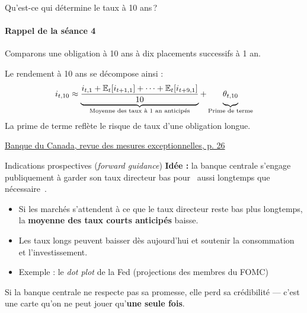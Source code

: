 \documentclass[aspectratio=169]{beamer}
\begin{document}
\begin{frame}[t]{Qu’est-ce qui détermine le taux à 10 ans\,?}\examtag
   \framesubtitle{Rappel de la séance 4}
   \vspace{0.25cm}
   Comparons une obligation à 10 ans à dix placements successifs à 1 an.

   \vspace{0.18cm}
   \begin{defbox}
      \small\raggedright
      Le rendement à 10 ans se décompose ainsi :
      {\large
      \begin{equation*}
         i_{t,10} \approx \underbrace{\frac{i_{t,1} + \mathbb{E}_t[i_{t+1,1}] + \cdots + \mathbb{E}_t[i_{t+9,1}]}{10}}_{\text{Moyenne des taux à 1 an anticipés}} + \underbrace{\theta_{t,10}\vphantom{\frac{1}{10}}}_{\text{Prime de terme}}
      \end{equation*}
      }
      La prime de terme reflète le risque de taux d’une obligation longue.
   \end{defbox}

   \smallskip
   {\scriptsize\hfill\href{https://www.bankofcanada.ca/wp-content/uploads/2025/01/review-policy-actions-during-pandemic.pdf}{Banque du Canada, revue des mesures exceptionnelles, p. 26}\par}
\end{frame}

\begin{frame}[t]{Indications prospectives (\textit{forward guidance})}\examtag
   \small
   \vspace{0.2cm}
   \textbf{Idée :} la banque centrale s'engage publiquement à garder son taux directeur bas pour \guillemotleft~aussi longtemps que nécessaire~\guillemotright.
   \vspace{0.2cm}
   \begin{itemize}
      \setlength\itemsep{0.2cm}
      \item Si les marchés s’attendent à ce que le taux directeur reste bas plus longtemps, la \textbf{moyenne des taux courts anticipés} baisse.
      \item Les taux longs peuvent baisser dès aujourd’hui et soutenir la consommation et l’investissement.
      \item Exemple : le \textit{dot plot} de la Fed (projections des membres du FOMC)
   \end{itemize}
   \vspace{0.15cm}
   \begin{warning}
      Si la banque centrale ne respecte pas sa promesse, elle perd sa crédibilité --- c'est une carte qu'on ne peut jouer qu'\textbf{une seule fois}.
   \end{warning}
\end{frame}
\end{document}
